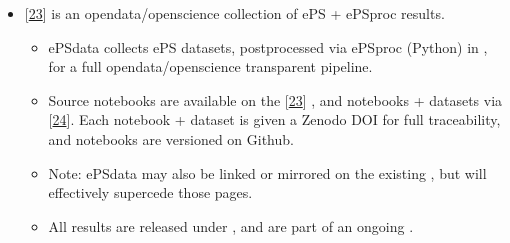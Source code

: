 \documentclass[letterpaper,table,10pt,english]{jupyterBook}
\begin{document}
\begin{itemize}
\item {} 
\sphinxAtStartPar
{} {[}\hyperlink{cite.backmatter/bibliography:id615}{23}{]} is an open\sphinxhyphen{}data/open\sphinxhyphen{}science collection of ePS + ePSproc results.
\begin{itemize}
\item {} 
\sphinxAtStartPar
ePSdata collects ePS datasets, post\sphinxhyphen{}processed via ePSproc (Python) in , for a full open\sphinxhyphen{}data/open\sphinxhyphen{}science transparent pipeline.

\end{itemize}
\begin{itemize}
\item {} 
\sphinxAtStartPar
Source notebooks are available on the  {[}\hyperlink{cite.backmatter/bibliography:id615}{23}{]} , and notebooks + datasets via  {[}\hyperlink{cite.backmatter/bibliography:id616}{24}{]}. Each notebook + dataset is given a Zenodo DOI for full traceability, and notebooks are versioned on Github.

\item {} 
\sphinxAtStartPar
Note: ePSdata may also be linked or mirrored on the existing , but will effectively supercede those pages.

\item {} 
\sphinxAtStartPar
All results are released under , and are part of an ongoing .

\end{itemize}

\end{itemize}
\end{document}
